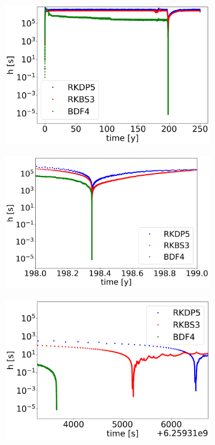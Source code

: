 \documentclass{report}
\begin{document}
\begin{figure}[H]
    \centering
    \begin{subfigure}{0.32\textwidth}
    	\centering
    	\includegraphics[width=1\textwidth]{images/TANDEMtimeEvolutionDTall.png}
    \end{subfigure}
    \begin{subfigure}{0.32\textwidth}
    	\centering
    	\includegraphics[width=1\textwidth]{images/TANDEMtimeEvolutionDTsurroundings.png}
    \end{subfigure}
    \begin{subfigure}{0.32\textwidth}
    	\centering
    	\includegraphics[width=1\textwidth]{images/TANDEMtimeEvolutionDTearthquake.png}

\end{subfigure}
\end{figure}
\end{document}
